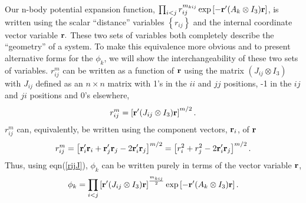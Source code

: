 Our n-body potential expansion function, $\prod_{i<j}r_{ij}^{m_{kij}}\exp
\left[ -{\bf r}^{\prime }(A_k\otimes I_3){\bf r}\right] $, is written
using the scalar ``distance'' variables $\left\{ r_{ij}\right\} $ and the
internal coordinate vector variable ${\bf r.}$ These two sets of
variables both completely describe the ``geometry'' of a system. To make
this equivalence more obvious and to present alternative forms for the $\phi
_k$, we will show the interchangeability of these two sets of variables. $%
r_{ij}^m$ can be written as a function of ${\bf r}$ using the matrix $%
\left( J_{ij}\otimes I_3\right) $ with $J_{ij}$ defined as an $n\times n$
matrix with 1's in the $ii$ and $jj$ positions, -1 in the $ij$ and $ji$
positions and 0's elsewhere\cite{Poshusta83,Kinghorn95a}, 
\begin{equation}
r_{ij}^m=\left[ {\bf r}^{\prime }(J_{ij}\otimes I_3){\bf r}\right]
^{m/2}.  \label{rijJ}
\end{equation}
$r_{ij}^m$ can, equivalently, be written using the component vectors, $%
{\bf r}_i$, of ${\bf r}$ 
\begin{equation}
r_{ij}^m = \left[ {\bf r}_i^{\prime }{\bf r}_i+{\bf r}_j^{\prime }%
{\bf r}_j-2{\bf r}_i^{\prime }{\bf r}_j\right] ^{m/2} 
= \left[ r_i^2+r_j^2-2{\bf r}_i^{\prime }{\bf r}_j\right] ^{m/2}.
\end{equation}
Thus, using eqn(\ref{rijJ}), $\phi _k$ can be written purely in terms of the
vector variable ${\bf r}$, 
\begin{equation}
\phi _k=\prod_{i<j}\left[ {\bf r}^{\prime }(J_{ij}\otimes I_3){\bf r}%
\right] ^{\frac{m_{kij}}2}\exp \left[ -{\bf r}^{\prime }(A_k\otimes I_3)%
{\bf r}\right] .  \label{phir}
\end{equation}

